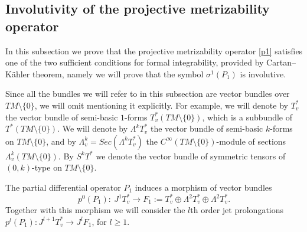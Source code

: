 \documentclass[pdftex]{sigma}
\numberwithin{equation}{section}
\begin{document}
\subsection{Involutivity of the projective metrizability operator}
\label{subsec:inv}

In this subsection we prove that the projective metrizability operator
\eqref{p1} satisf\/ies one of the two suf\/f\/icient conditions for formal
integrability, provided by Cartan--K\"ahler theorem, namely we will
prove that the symbol $\sigma^1(P_1)$ is involutive.

Since all the bundles we will refer to in this subsection are vector
bundles over $TM\setminus\{0\}$, we will omit mentioning it
explicitly. For example, we will denote by $T^*_v$ the vector
bundle of semi-basic $1$-forms $T^*_v(TM\setminus\{0\})$, which is
a subbundle of $T^*(TM\setminus\{0\})$. We will denote by
$\Lambda^kT^*_v$ the vector bundle of semi-basic $k$-forms on
$TM\setminus\{0\}$, and by
$\Lambda^k_v=Sec\left(\Lambda^kT^*_v\right)$ the
$C^{\infty}(TM\setminus\{0\})$-module of sections $\Lambda^k_v(TM\setminus\{0\})$. By $S^kT^*$ we denote the vector
bundle of symmetric tensors of $(0,k)$-type on $TM\setminus\{0\}$.

The partial dif\/ferential operator $P_1$ induces a morphism of vector
bundles
\[
 p^0(P_1): \ J^1T^*_v \to F_1:=T^*_v \oplus \Lambda^2 T^*_v \oplus
\Lambda^2 T^*_v.
\] Together with this morphism we will consider the $l$th order jet prolongations $p^l(P_1):
J^{l+1}T^*_v \to J^{l}F_1$, for $l\geq 1$.
\end{document}
